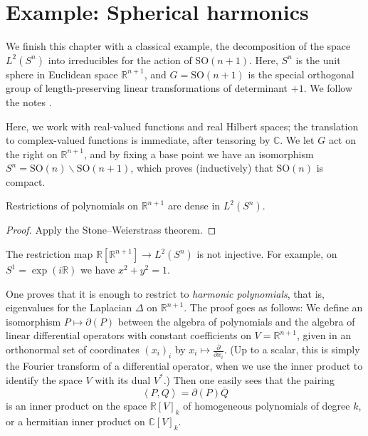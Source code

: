 \section{Example: Spherical harmonics}
\label{section-spherical-harmonics}

We finish this chapter with a classical example, the decomposition of the space $L^2(S^n)$ into irreducibles for the action of $\text{SO}(n+1)$. Here, $S^n$ is the unit sphere in Euclidean space $\mathbb R^{n+1}$, and $G=\text{SO}(n+1)$ is the special orthogonal group of length-preserving linear transformations of determinant $+1$. We follow the notes \cite{Gallier}.

Here, we work with real-valued functions and real Hilbert spaces; the translation to complex-valued functions is immediate, after tensoring by $\mathbb C$. We let $G$ act on the right on $\mathbb R^{n+1}$, and by fixing a base point we have an isomorphism $S^n = \text{SO}(n)\backslash \text{SO}(n+1)$, which proves (inductively) that $\text{SO}(n)$ is compact.

\begin{lemma}
 \label{lemma-polynomials-dense-onsphere}
Restrictions of polynomials on $\mathbb R^{n+1}$ are dense in $L^2(S^n)$. 
\end{lemma}

\begin{proof}
 Apply the Stone--Weierstrass theorem.
\end{proof}

The restriction map $\mathbb R[\mathbb R^{n+1}] \to L^2(S^n)$ is not injective. For example, on $S^1 = \exp(i\mathbb R)$ we have $x^2 + y^2 = 1$. 

One proves that it is enough to restrict to \emph{harmonic polynomials}, that is, eigenvalues for the Laplacian $\Delta$ on $\mathbb R^{n+1}$. The proof goes as follows: We define an isomorphism $P\mapsto \partial (P)$ between the algebra of polynomials and the algebra of linear differential operators with constant coefficients on $V = \mathbb R^{n+1}$, given in an orthonormal set of coordinates $(x_i)_i$ by $x_i\mapsto \frac{\partial}{\partial x_i}$. (Up to a scalar, this is simply the Fourier transform of a differential operator, when we use the inner product to identify the space $V$ with its dual $V^*$.) Then one easily sees that the pairing 
\begin{equation}
 \label{equation-pairing-homogeneous}
 \left< P , Q\right> = \partial(P) \overline{Q}
\end{equation}
is an inner product on the space $\mathbb R[V]_k$ of homogeneous polynomials of degree $k$, or a hermitian inner product on $\mathbb C[V]_k$.


